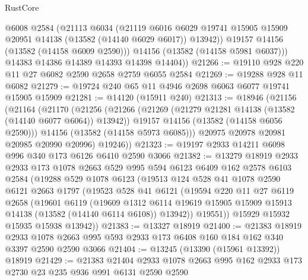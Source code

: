 \begin{lexlean}{RustCore}
\begin{coremodule}
            @6008
            @2584
            (@21113
              @6034
              (@21119
                @6016
                @6029
                @19741
                @15905
                @15909
                @20951
                @14138
                (@13582 (@14140 @6029 @6017))
                @13942))
            @19157
            @14156
            (@13582 (@14158 @6009 @2590)))
          @14156
          (@13582 (@14158 @5981 @6037)))
        @14383
        @14386
        @14389
        @14393
        @14398
        @14404))
@21266 := @19110 @928 @220 @11 @27 @6082 @2590 @2658 @2759 @6055 @2584
@21269 := @19288 @928 @11 @6082
@21279 := @19724 @240 @65 @11 @4946 @2698 @6063 @6077 @19741 @15905 @15909
@21281 := @14120 (@15911 @240)
@21313 := @18946
    (@21156
      (@21164
        (@21170
          (@21256
            (@21266
              (@21269 (@21279 @21281 @14138 (@13582 (@14140 @6077 @6064)) @13942))
              @19157
              @14156
              (@13582 (@14158 @6056 @2590)))
            @14156
            (@13582 (@14158 @5973 @6085)))
          @20975
          @20978
          @20981
          @20985
          @20990
          @20996)
        @19246))
@21323 := @19197 @2933 @14211 @6098 @996 @340 @173 @6126 @6410 @2590 @3066
@21382 := @13279
    @18919
    @2933
    @2933
    @173
    @1078
    @2663
    @529
    @995
    @594
    @6123
    @6409
    @162
    @2578
    @6103
    @2584
    (@19288
      @529
      @1078
      @6123
      (@19513
        @124
        @528
        @41
        @1078
        @2590
        @6121
        @2663
        @1797
        (@19523
          @528
          @41
          @6121
          (@19594
            @220
            @11
            @27
            @6119
            @2658
            (@19601
              @6119
              (@19609
                @1312
                @6114
                @19619
                @15905
                @15909
                @15913
                @14138
                (@13582 (@14140 @6114 @6108))
                @13942))
            @19551))
        @15929
        @15932
        @15935
        @15938
        @13942))
@21383 := @13327 @18919
@21400 := @21383
    @18919
    @2933
    @1078
    @2663
    @995
    @593
    @2933
    @173
    @6408
    @160
    @184
    @162
    @340
    @3397
    @2590
    @2590
    @3066
@21404 := @13245 (@13390 (@15961 @13392)) @18919
@21429 := @21383
    @21404
    @2933
    @1078
    @2663
    @995
    @162
    @2933
    @173
    @2730
    @23
    @235
    @936
    @991
    @6131
    @2590
    @2590

\end{coremodule}
\end{lexlean}
